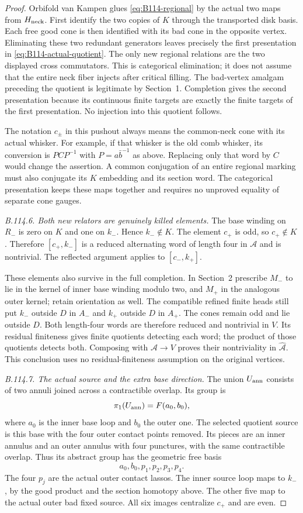 \begin{proof}
Orbifold van Kampen glues \eqref{eq:B114-regional} by the actual
two maps from $H_{\rm neck}$. First identify the two copies of
$K$ through the transported disk basis. Each free good cone is
then identified with its bad cone in the opposite vertex.
Eliminating these two redundant generators leaves precisely the
first presentation in \eqref{eq:B114-actual-quotient}.
The only new regional relations are the two displayed cross
commutators. This is categorical elimination; it does not assume
that the entire neck fiber injects after critical filling.
The bad-vertex amalgam preceding the quotient is legitimate by
Section~1. Completion gives the second presentation because its
continuous finite targets are exactly the finite targets of the
first presentation. No injection into this quotient follows.

The notation $c_\pm$ in this pushout always means the common-neck
cone with its actual whisker. For example, if that whisker is the
old comb whisker, its conversion is $P C P^{-1}$ with
$P=a\bar b^{-1}$ as above. Replacing only that word by $C$ would
change the assertion. A common conjugation of an entire regional
marking must also conjugate its $K$ embedding and its section
word. The categorical presentation keeps these maps together
and requires no unproved equality of separate cone gauges.

\emph{B.114.6. Both new relators are genuinely killed elements.}
The base winding on $R_-$ is zero on $K$ and one on $k_-$.
Hence $k_-\notin K$. The element $c_+$ is odd, so $c_+\notin K$.
Therefore $[c_+,k_-]$ is a reduced alternating word of length
four in $\mathcal A$ and is nontrivial. The reflected argument
applies to $[c_-,k_+]$.

These elements also survive in the full completion. In Section~2
prescribe $M_-$ to lie in the kernel of inner base winding modulo
two, and $M_+$ in the analogous outer kernel; retain orientation
as well. The compatible refined finite heads still put $k_-$
outside $D$ in $A_-$ and $k_+$ outside $D$ in $A_+$. The cones
remain odd and lie outside $D$. Both length-four words are
therefore reduced and nontrivial in $V$. Its residual finiteness
gives finite quotients detecting each word; the product of those
quotients detects both. Composing with $\mathcal A\to V$ proves
their nontriviality in $\widehat{\mathcal A}$. This conclusion
uses no residual-finiteness assumption on the original vertices.

\emph{B.114.7. The actual source and the extra base direction.}
The union $U_{\rm ann}$ consists of two annuli joined across a
contractible overlap. Its group is
\[
 \pi_1(U_{\rm ann})=F(a_0,b_0),
\]
where $a_0$ is the inner base loop and $b_0$ the outer one.
The selected quotient source is this base with the four outer
contact points removed. Its pieces are an inner annulus and an
outer annulus with four punctures, with the same contractible
overlap. Thus its abstract group has the geometric free basis
\[
 a_0,b_0,p_1,p_2,p_3,p_4.
\]
The four $p_j$ are the actual outer contact lassos. The inner
source loop maps to $k_-$, by the good product and the section
homotopy above. The other five map to the actual outer bad
fixed source. All six images centralize $c_+$ and are even.


\end{proof}
